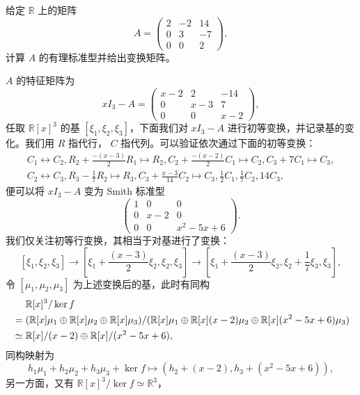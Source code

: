 \documentclass[fontset=none,zihao=-4]{Notes}
\begin{document}
\begin{example}
  给定 $\mathbb{R}$ 上的矩阵
  \[
    A=\begin{pmatrix}
      2 & -2 & 14 \\
      0 & 3 & -7 \\
      0 & 0 & 2
    \end{pmatrix} , 
  \]
  计算 $A$ 的有理标准型并给出变换矩阵。
\end{example}
\begin{solution}
  $A$ 的特征矩阵为
  \[
    xI_3-A=\begin{pmatrix}
      x-2 & 2 & -14 \\
      0 & x-3 & 7 \\
      0 & 0 & x-2
    \end{pmatrix}  ,
  \]
  任取 $\mathbb{R}[x]^3$ 的基 $[\xi_1,\xi_2,\xi_3]$，下面我们对 
  $xI_3-A$ 进行初等变换，并记录基的变化。我们用 $R$ 指代行，
  $C$ 指代列。可以验证依次通过下面的初等变换：
  \begin{gather*}
    C_1\leftrightarrow C_2,R_2+\frac{-(x-3)}{2}R_1\mapsto R_2,
    C_2+\frac{-(x-2)}{2}C_1\mapsto C_2,
    C_3+7C_1\mapsto C_3,\\
    C_2\leftrightarrow C_3,R_3-\frac{1}{7}R_2\mapsto R_3,
    C_3+\frac{x-3}{14}C_2\mapsto C_3,
    \frac{1}{2}C_1,\frac{1}{7}C_2,14C_3,
  \end{gather*}
  便可以将 $xI_3-A$ 变为 Smith 标准型
  \[
    \begin{pmatrix}
      1 & 0 & 0 \\
      0  & x-2& 0 \\
      0 & 0 & x^2-5x+6
    \end{pmatrix}.
  \]
  我们仅关注初等行变换，其相当于对基进行了变换：
  \[
    [\xi_1,\xi_2,\xi_3]\to \left[\xi_1+\frac{(x-3)}{2}\xi_2,\xi_2,\xi_3\right]
    \to \left[\xi_1+\frac{(x-3)}{2}\xi_2,\xi_2+\frac{1}{7}\xi_3,\xi_3\right],
  \]
  令 $[\mu_1,\mu_2,\mu_3]$ 为上述变换后的基，此时有同构
  \begin{align*}
    &\hphantom{{}={}}\mathbb{R}[x]^3/\ker f
    \\&=(\mathbb{R}[x]\mu_1\oplus\mathbb{R}[x]\mu_2\oplus\mathbb{R}[x]\mu_3)
    /(\mathbb{R}[x]\mu_1\oplus \mathbb{R}[x](x-2)\mu_2\oplus\mathbb{R}[x](x^2-5x+6)\mu_3)\\
    &\simeq \mathbb{R}[x]/(x-2)\oplus \mathbb{R}[x]/(x^2-5x+6),
  \end{align*}
  同构映射为
  \[
    h_1\mu_1+h_2\mu_2+h_3\mu_3+\ker f\mapsto (h_2+(x-2),h_3+(x^2-5x+6)),
  \]
  另一方面，又有 $\mathbb{R}[x]^3/\ker f\simeq \mathbb{R}^3$，

\end{solution}
\end{document}
